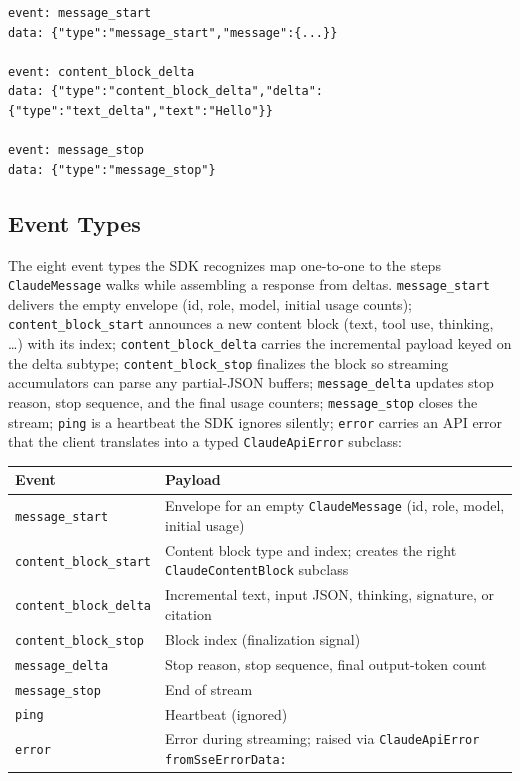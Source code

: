 \documentclass[a4paper,10pt,fleqn]{article}
\newcommand{\cls}[1]{\texttt{#1}}
\begin{document}
\begin{lstlisting}[language={}]
event: message_start
data: {"type":"message_start","message":{...}}

event: content_block_delta
data: {"type":"content_block_delta","delta":{"type":"text_delta","text":"Hello"}}

event: message_stop
data: {"type":"message_stop"}
\end{lstlisting}

\subsection{Event Types}

The eight event types the SDK recognizes map one-to-one to the
steps \cls{ClaudeMessage} walks while assembling a response
from deltas.  \texttt{message\_start} delivers the empty
envelope (id, role, model, initial usage counts);
\texttt{content\_block\_start} announces a new content block
(text, tool use, thinking, \ldots) with its index;
\texttt{content\_block\_delta} carries the incremental payload
keyed on the delta subtype; \texttt{content\_block\_stop}
finalizes the block so streaming accumulators can parse any
partial-JSON buffers; \texttt{message\_delta} updates stop
reason, stop sequence, and the final usage counters;
\texttt{message\_stop} closes the stream; \texttt{ping} is a
heartbeat the SDK ignores silently; \texttt{error} carries an
API error that the client translates into a typed
\cls{ClaudeApiError} subclass:

\begin{center}
\small
\begin{tabular}{@{}lp{7.5cm}@{}}
\toprule
\textbf{Event} & \textbf{Payload} \\
\midrule
\texttt{message\_start}        & Envelope for an empty \cls{ClaudeMessage} (id, role, model, initial usage) \\
\texttt{content\_block\_start} & Content block type and index; creates the right \cls{ClaudeContentBlock} subclass \\
\texttt{content\_block\_delta} & Incremental text, input JSON, thinking, signature, or citation \\
\texttt{content\_block\_stop}  & Block index (finalization signal) \\
\texttt{message\_delta}        & Stop reason, stop sequence, final output-token count \\
\texttt{message\_stop}         & End of stream \\
\texttt{ping}                  & Heartbeat (ignored) \\
\texttt{error}                 & Error during streaming; raised via \texttt{ClaudeApiError fromSseErrorData:} \\
\bottomrule
\end{tabular}
\end{center}
\end{document}
